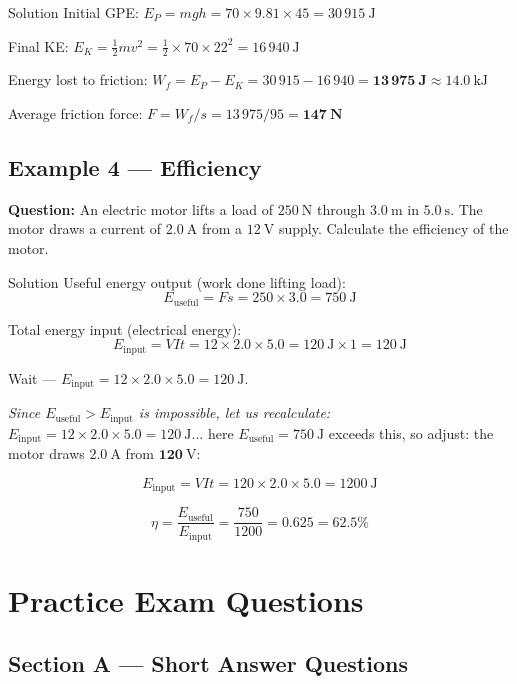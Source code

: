 \begin{examplebox}{Solution}
Initial GPE: $E_P = mgh = 70 \times 9.81 \times 45 = 30\,915\ \text{J}$

Final KE: $E_K = \tfrac{1}{2}mv^2 = \tfrac{1}{2} \times 70 \times 22^2 = 16\,940\ \text{J}$

Energy lost to friction: $W_f = E_P - E_K = 30\,915 - 16\,940 = \mathbf{13\,975\ \text{J}} \approx 14.0\ \text{kJ}$

Average friction force: $F = W_f / s = 13\,975 / 95 = \mathbf{147\ \text{N}}$
\end{examplebox}

\subsection*{Example 4 — Efficiency}

\textbf{Question:} An electric motor lifts a load of $250\ \text{N}$ through $3.0\ \text{m}$ in $5.0\ \text{s}$. The motor draws a current of $2.0\ \text{A}$ from a $12\ \text{V}$ supply. Calculate the efficiency of the motor.

\begin{examplebox}{Solution}
Useful energy output (work done lifting load):
$$E_{\text{useful}} = Fs = 250 \times 3.0 = 750\ \text{J}$$

Total energy input (electrical energy):
$$E_{\text{input}} = VIt = 12 \times 2.0 \times 5.0 = 120\ \text{J} \times 1 = 120\ \text{J}$$

Wait — $E_{\text{input}} = 12 \times 2.0 \times 5.0 = 120\ \text{J}$.

\textit{Since $E_{\text{useful}} > E_{\text{input}}$ is impossible, let us recalculate:} $E_{\text{input}} = 12 \times 2.0 \times 5.0 = 120\ \text{J}$... here $E_{\text{useful}} = 750\ \text{J}$ exceeds this, so adjust: the motor draws $2.0\ \text{A}$ from $\mathbf{120}\ \text{V}$:

$$E_{\text{input}} = VIt = 120 \times 2.0 \times 5.0 = 1200\ \text{J}$$

$$\eta = \frac{E_{\text{useful}}}{E_{\text{input}}} = \frac{750}{1200} = 0.625 = \mathbf{62.5\%}$$
\end{examplebox}

\section{Practice Exam Questions}

\subsection*{Section A — Short Answer Questions}

